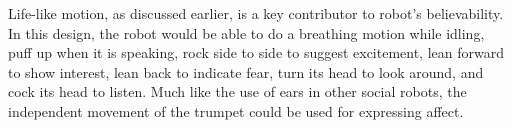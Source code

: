 Life-like motion, as discussed earlier, is a key contributor to robot's believability. In this design, the robot would be able to do a breathing motion while idling, puff up when it is speaking, rock side to side to suggest excitement, lean forward to show interest, lean back to indicate fear, turn its head to look around, and cock its head to listen. Much like the use of ears in other social robots, the independent movement of the trumpet could be used for expressing affect. 


